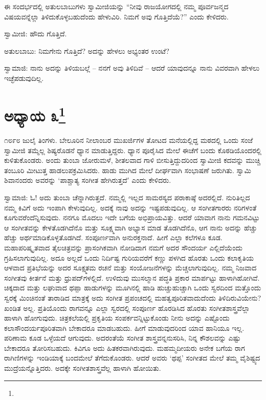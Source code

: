 ಈ ಸಂದರ್ಭದಲ್ಲಿ ಅತುಲಬಾಬುಗಳು ಸ್ವಾಮೀಜಿಯನ್ನು “ನೀವು ರಾಜಯೋಗದಲ್ಲಿ ನಮ್ಮ ಪೂರ್ವಜನ್ಮದ ವಿಷಯವನ್ನೆಲ್ಲಾ ತಿಳಿದುಕೊಳ್ಳಬಹುದೆಂದು ಹೇಳುವಿರಿ. ನಿಮಗೆ ಅವು ಗೊತ್ತಿದೆಯೆ?” ಎಂದು ಕೇಳಿದರು.

ಸ್ವಾಮೀಜಿ: ಹೌದು ಗೊತ್ತಿದೆ.

ಅತುಲಬಾಬು: ನಿಮಗೇನು ಗೊತ್ತಿದೆ? ಅದನ್ನು ಹೇಳಲು ಅಭ್ಯಂತರ ಉಂಟೆ?

ಸ್ವಾಮಾಜಿ: ನಾನು ಅದನ್ನು ತಿಳಿಯಬಲ್ಲೆ – ನನಗೆ ಅವು ತಿಳಿದಿವೆ – ಆದರೆ ಯಾವುದನ್ನೂ ನಾನು ವಿವರವಾಗಿ ಹೇಳಲು ಇಚ್ಛೆಪಡುವುದಿಲ್ಲ.

\newpage

\chapter[ಅಧ್ಯಾಯ ೩]{ಅಧ್ಯಾಯ ೩\protect\footnote{}}

೧೮೯೮ ಜುಲೈ ತಿಂಗಳು. ಬೇಲೂರಿನ ನೀಲಾಂಬರ ಮುಖರ್ಜಿಗಳ ತೋಟದ ಮನೆಯಲ್ಲಿದ್ದ ಮಠದಲ್ಲಿ ಒಂದು ಸಂಜೆ ಸ್ವಾಮೀಜಿ ತಮ್ಮೆಲ್ಲ ಶಿಷ್ಯರೊಡನೆ ಧ್ಯಾನ ಮಾಡುತ್ತಿದ್ದರು. ಧ್ಯಾನ ಪೂರೈಸಿದ ಮೇಲೆ ಈಚೆಗೆ ಬಂದು ಕೊಠಡಿಯೊಂದರಲ್ಲಿ ಕುಳಿತುಕೊಂಡರು. ಅಂದು ತುಂಬಾ ಜೋರುಮಳೆ, ಶೀತಲವಾದ ಗಾಳಿ ಬೀಸುತ್ತಿದ್ದುದರಿಂದ ಸ್ವಾಮೀಜಿ ಕದವನ್ನು ಮುಚ್ಚಿ ತಂಬೂರಿ ಮೀಟುತ್ತ ಹಾಡಲುಪಕ್ರಮಿಸಿದರು. ಹಾಡು ಮುಗಿದ ಮೇಲೆ ದೀರ್ಘವಾಗಿ ಸಂಭಾಷಣೆ ಜರುಗಿತು. ಸ್ವಾಮಿ ಶಿವಾನಂದರು ಅವರನ್ನು ‘ಪಾಶ್ಚಾತ್ಯ ಸಂಗೀತ ಹೇಗಿರುತ್ತದೆ’ ಎಂದು ಕೇಳಿದರು.

ಸ್ವಾಮಾಜಿ: ಓ! ಅದು ತುಂಬಾ ಚೆನ್ನಾಗಿರುತ್ತದೆ. ನಮ್ಮಲ್ಲಿ ಇಲ್ಲದ ಸಾಮರಸ್ಯದ ಪರಾಕಾಷ್ಠೆ ಅದರಲ್ಲಿದೆ. ನುರಿತಿಲ್ಲದ ನಮ್ಮ ಕಿವಿಗೆ ಅದು ಇಂಪಾಗಿ ಕೇಳುವುದಿಲ್ಲ. ಅದಕ್ಕೆ ನಾವು ಅದನ್ನು ಇಷ್ಟಪಡುವುದಿಲ್ಲ. ಆ ಸಂಗೀತಗಾರರು ನರಿಗಳಂತೆ ಕೂಗುವರೆಂದೆನ್ನಿಸುವುದು. ನನಗೂ ಮೊದಲು ಇದೇ ಬಗೆಯ ಅಭಿಪ್ರಾಯವಿತ್ತು. ಆದರೆ ಯಾವಾಗ ನಾನು ಗಮನವಿಟ್ಟು ಆ ಸಂಗೀತವನ್ನು ಕೇಳತೊಡಗಿದೆನೊ ಮತ್ತು ಸೂಕ್ಷ್ಮವಾಗಿ ಅಭ್ಯಾಸ ಮಾಡ ತೊಡಗಿದೆನೊ, ಆಗ ನಾನು ಅದನ್ನು ಹೆಚ್ಚು ಹೆಚ್ಚು ಅರ್ಥಮಾಡಿಕೊಳ್ಳತೊಡಗಿದೆ. ಸಂಪೂರ್ಣವಾಗಿ ಅನುರಕ್ತನಾದೆ. ಹೀಗೆ ಎಲ್ಲಾ ಕಲೆಗಳೂ ಕೂಡ. ಮಹಾಪರಿಷ್ಕೃತವಾದ ತೈಲಚಿತ್ರವನ್ನು ಪ್ರಾಸಂಗಿಕವಾಗಿ ನೋಡಿದಾಗ ನಮಗೆ ಅದರ ಸೌಂದರ್ಯ ಎಲ್ಲಿದೆಯೆಂದು ಗ್ರಹಿಸಲಾಗುವುದಿಲ್ಲ. ಅದೂ ಅಲ್ಲದೆ ಒಂದು ನಿರ್ದಿಷ್ಟ ಗುರಿಯವರೆಗೆ ಕಣ್ಣು ಪಳಗಿದ ಹೊರತು ಒಂದು ಕಲಾಕೃತಿಯ ಆಳವಾದ ಪ್ರತಿಭೆಯನ್ನು ಅದರ ಸೂಕ್ಷ್ಮತಮ ರಚನೆ ಮತ್ತು ಸಂಯೋಜನೆಗಳನ್ನು ಮೆಚ್ಚಲಾಗುವುದಿಲ್ಲ. ನಮ್ಮ ನಿಜವಾದ ಸಂಗೀತವು ಕೀರ್ತನೆ ಮತ್ತು ಧ್ರುಪದ್‌ಗಳಲ್ಲಿದೆ. ಉಳಿದುವು ಮುಸಲ್ಮಾನ ಪದ್ಧತಿ ಪ್ರಕಾರ ಮಾರ್ಪಟ್ಟು ಹಾಳಾಗಿಹೋಗಿವೆ. ಚಿಕ್ಕದಾದ ಮತ್ತು ಲಘುವಾದ ಥಪ್ಪಾ ಹಾಡುಗಳನ್ನು ಮೂಗಿನಲ್ಲಿ ಹಾಡಿ ಹುಚ್ಚುಹುಚ್ಚಾಗಿ ಒಂದು ಸ್ವರದಿಂದ ಮತ್ತೊಂದು ಸ್ವರಕ್ಕೆ ಮಿಂಚಿನಂತೆ ತಾರಾಡಿದ ಮಾತ್ರಕ್ಕೆ ಅದು ಸಂಗೀತ ಪ್ರಪಂಚದಲ್ಲಿ ಮಹತ್ವಪೂರಿತವಾದುದೆಂದು ತಿಳಿದಿರುವಿಯೇನು? ಖಂಡಿತ ಅಲ್ಲ. ಪ್ರತಿಯೊಂದು ರಾಗವನ್ನೂ ಎಲ್ಲಾ ಸ್ವರದಲ್ಲಿ ಸಂಪೂರ್ಣ ಹೊರಡಿಸಿದ ಹೊರತು ಸಂಗೀತಶಾಸ್ತ್ರವೆಲ್ಲಾ ಹಾಳಾಗಿ ಹೋಗುವುದು. ಚಿತ್ರಕಲೆಯಲ್ಲಿ ಪ್ರಕೃತಿಯ ಸಂಪರ್ಕವನ್ನಿಟ್ಟುಕೊಂಡು ನೀನು ಅದನ್ನು ಎಷ್ಟೊಂದು ಕಲಾಸೌಂದರ್ಯಪೂರಿತವಾಗಿ ಬೇಕಾದರೂ ಮಾಡಬಹುದು. ಹೀಗೆ ಮಾಡುವುದರಿಂದ ಯಾವ ಹಾನಿಯೂ ಇಲ್ಲ. ಪರಿಣಾಮ ಕೂಡ ಒಳ್ಳೆಯದೆ ಆಗುವುದು. ಅದರಂತೆಯೆ ಸಂಗೀತ ಶಾಸ್ತ್ರವನ್ನನುಸರಿಸಿ, ನಿನ್ನ ಕೌಶಲವನ್ನು ಎಷ್ಟು ಬೇಕಾದರೂ ತೋರಿಸಬಹುದು. ಕಿವಿಗೂ ಅದು ಹಿತಕರವಾಗಿರುವುದು. ಮಹಮ್ಮದೀಯರು ಅನೇಕ ಬಗೆಯ ರಾಗ ರಾಗಿಣಿಗಳನ್ನು ಇಂಡಿಯಾಕ್ಕೆ ಬಂದಮೇಲೆ ತೆಗೆದುಕೊಂಡರು. ಆದರೆ ಅವರು ‘ಥಪ್ಪ’ ಸಂಗೀತದ ಮೇಲೆ ತಮ್ಮ ವೈಶಿಷ್ಟ್ಯದ ಮುದ್ರೆಯನ್ನೊತ್ತಿದರು. ಅದಕ್ಕೇ ಸಂಗೀತಶಾಸ್ತ್ರವೆಲ್ಲ ಹಾಳಾಗಿ ಹೋಯಿತು.

